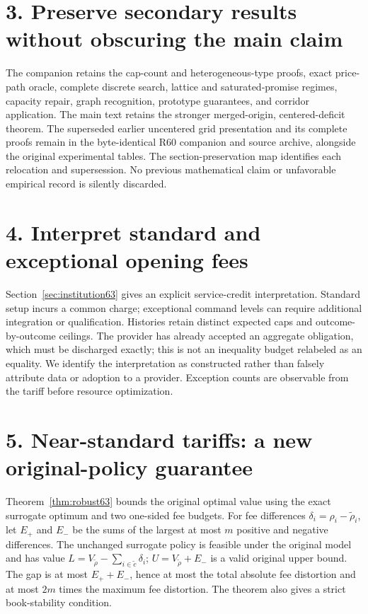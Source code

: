 \section*{3. Preserve secondary results without obscuring the main claim}
The companion retains the cap-count and heterogeneous-type proofs, exact price-path oracle, complete discrete search, lattice and saturated-promise regimes, capacity repair, graph recognition, prototype guarantees, and corridor application. The main text retains the stronger merged-origin, centered-deficit theorem. The superseded earlier uncentered grid presentation and its complete proofs remain in the byte-identical R60 companion and source archive, alongside the original experimental tables. The section-preservation map identifies each relocation and supersession. No previous mathematical claim or unfavorable empirical record is silently discarded.

\section*{4. Interpret standard and exceptional opening fees}
Section~\ref{sec:institution63} gives an explicit service-credit interpretation. Standard setup incurs a common charge; exceptional command levels can require additional integration or qualification. Histories retain distinct expected caps and outcome-by-outcome ceilings. The provider has already accepted an aggregate obligation, which must be discharged exactly; this is not an inequality budget relabeled as an equality. We identify the interpretation as constructed rather than falsely attribute data or adoption to a provider. Exception counts are observable from the tariff before resource optimization.

\section*{5. Near-standard tariffs: a new original-policy guarantee}
Theorem~\ref{thm:robust63} bounds the original optimal value using the exact surrogate optimum and two one-sided fee budgets. For fee differences $\delta_i=\rho_i-\widetilde\rho_i$, let $E_+$ and $E_-$ be the sums of the largest at most $m$ positive and negative differences. The unchanged surrogate policy is feasible under the original model and has value $L=V_{\widetilde\rho}-\sum_{i\in\widetilde c}\delta_i$; $U=V_{\widetilde\rho}+E_-$ is a valid original upper bound. The gap is at most $E_++E_-$, hence at most the total absolute fee distortion and at most $2m$ times the maximum fee distortion. The theorem also gives a strict book-stability condition.

